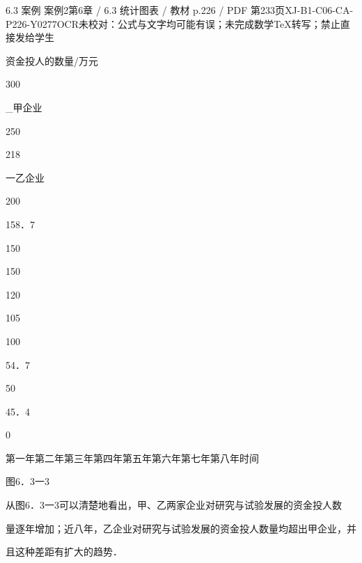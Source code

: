 \begin{bankitem}{6.3 案例 案例2}{第6章 / 6.3 统计图表 / 教材 p.226 / PDF 第233页}{XJ-B1-C06-CA-P226-Y0277}{OCR未校对：公式与文字均可能有误；未完成数学TeX转写；禁止直接发给学生}
\begin{ocrdraft}
资金投人的数量/万元
\par
300
\par
\_甲企业
\par
250
\par
218
\par
一乙企业
\par
200
\par
158．7
\par
150
\par
150
\par
120
\par
105
\par
100
\par
54．7
\par
50
\par
45．4
\par
0
\par
第一年第二年第三年第四年第五年第六年第七年第八年时间
\par
图6．3一3
\par
从图6．3一3可以清楚地看出，甲、乙两家企业对研究与试验发展的资金投人数
\par
量逐年增加；近八年，乙企业对研究与试验发展的资金投人数量均超出甲企业，并
\par
且这种差距有扩大的趋势．
\end{ocrdraft}
\end{bankitem}
